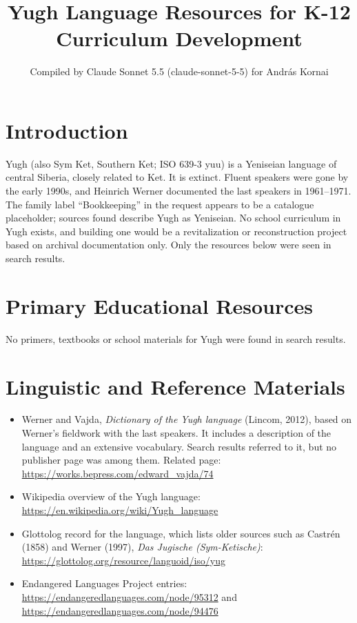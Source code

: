 \documentclass[12pt]{article}
\title{Yugh Language Resources for K-12 Curriculum Development}
\author{Compiled by Claude Sonnet 5.5 (claude-sonnet-5-5) for Andr\'as Kornai}
\date{}
\begin{document}
\maketitle

\section{Introduction}
Yugh (also Sym Ket, Southern Ket; ISO 639-3 yuu) is a Yeniseian language of central Siberia, closely related to Ket. It is extinct. Fluent speakers were gone by the early 1990s, and Heinrich Werner documented the last speakers in 1961--1971. The family label ``Bookkeeping'' in the request appears to be a catalogue placeholder; sources found describe Yugh as Yeniseian. No school curriculum in Yugh exists, and building one would be a revitalization or reconstruction project based on archival documentation only. Only the resources below were seen in search results.

\section{Primary Educational Resources}
No primers, textbooks or school materials for Yugh were found in search results.

\section{Linguistic and Reference Materials}
\begin{itemize}
\item Werner and Vajda, \emph{Dictionary of the Yugh language} (Lincom, 2012), based on Werner's fieldwork with the last speakers. It includes a description of the language and an extensive vocabulary. Search results referred to it, but no publisher page was among them. Related page: \url{https://works.bepress.com/edward_vajda/74}
\item Wikipedia overview of the Yugh language: \url{https://en.wikipedia.org/wiki/Yugh_language}
\item Glottolog record for the language, which lists older sources such as Castr\'en (1858) and Werner (1997), \emph{Das Jugische (Sym-Ketische)}: \url{https://glottolog.org/resource/languoid/iso/yug}
\item Endangered Languages Project entries: \url{https://endangeredlanguages.com/node/95312} and \url{https://endangeredlanguages.com/node/94476}
\end{itemize}
\end{document}
